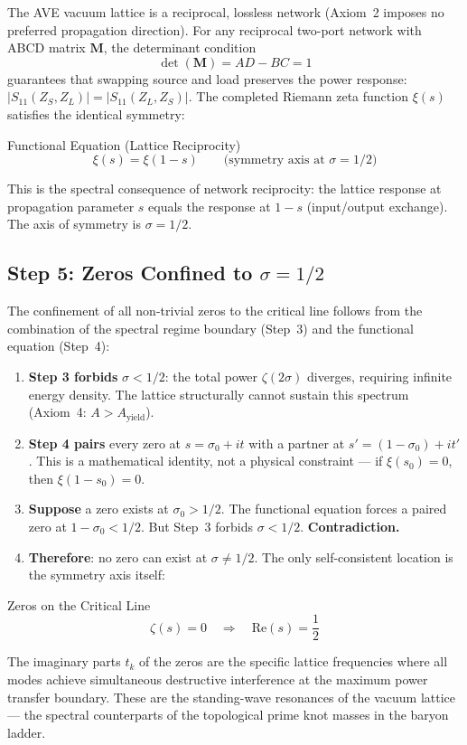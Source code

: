 The AVE vacuum lattice is a reciprocal, lossless network (Axiom~2 imposes no preferred propagation direction). For any reciprocal two-port network with ABCD matrix $\mathbf{M}$, the determinant condition
\begin{equation}
    \det(\mathbf{M}) = AD - BC = 1
\end{equation}
guarantees that swapping source and load preserves the power response: $|S_{11}(Z_S, Z_L)| = |S_{11}(Z_L, Z_S)|$. The completed Riemann zeta function $\xi(s)$ satisfies the identical symmetry:
\begin{resultbox}{Functional Equation (Lattice Reciprocity)}
\begin{equation}
    \xi(s) = \xi(1-s) \qquad\text{(symmetry axis at } \sigma = 1/2\text{)}
\end{equation}
\end{resultbox}
This is the spectral consequence of network reciprocity: the lattice response at propagation parameter $s$ equals the response at $1-s$ (input/output exchange). The axis of symmetry is $\sigma = 1/2$.

\subsection{Step 5: Zeros Confined to $\sigma = 1/2$}

The confinement of all non-trivial zeros to the critical line follows from the combination of the spectral regime boundary (Step~3) and the functional equation (Step~4):

\begin{enumerate}
    \item \textbf{Step 3 forbids} $\sigma < 1/2$: the total power $\zeta(2\sigma)$ diverges, requiring infinite energy density. The lattice structurally cannot sustain this spectrum (Axiom~4: $A > A_\mathrm{yield}$).
    \item \textbf{Step 4 pairs} every zero at $s = \sigma_0 + it$ with a partner at $s' = (1 - \sigma_0) + it'$. This is a mathematical identity, not a physical constraint --- if $\xi(s_0) = 0$, then $\xi(1-s_0) = 0$.
    \item \textbf{Suppose} a zero exists at $\sigma_0 > 1/2$. The functional equation forces a paired zero at $1 - \sigma_0 < 1/2$. But Step~3 forbids $\sigma < 1/2$. \textbf{Contradiction.}
    \item \textbf{Therefore}: no zero can exist at $\sigma \neq 1/2$. The only self-consistent location is the symmetry axis itself:
\end{enumerate}
\begin{resultbox}{Zeros on the Critical Line}
\begin{equation}
    \zeta(s) = 0 \quad\Longrightarrow\quad \mathrm{Re}(s) = \frac{1}{2}
\end{equation}
\end{resultbox}
The imaginary parts $t_k$ of the zeros are the specific lattice frequencies where all modes achieve simultaneous destructive interference at the maximum power transfer boundary. These are the standing-wave resonances of the vacuum lattice --- the spectral counterparts of the topological prime knot masses in the baryon ladder.

